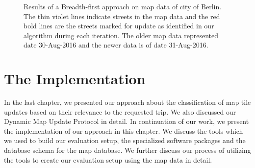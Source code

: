 \begin{figure}
\centering
{}
\hspace{5mm}
\hspace{5mm}
\label{fg:bfsberlin}
\caption{Results of a Breadth-first approach on map data of city of Berlin. The thin violet lines indicate streets in the map data and the red bold lines are the streets marked for update as identified in our algorithm during each iteration. The older map data represented date 30-Aug-2016 and the newer data is of date 31-Aug-2016.}
\end{figure}



\chapter{The Implementation}\label{ch:implementation} %
In the last chapter, we presented our approach about the classification of map tile updates based on their relevance to the requested trip. We also discussed our Dynamic Map Update Protocol in detail. In continuation of our work, we present the implementation of our approach in this chapter. We discuss the tools which we used to build our evaluation setup, the specialized software packages and the database schema for the map database. We further discuss our process of utilizing the tools to create our evaluation setup using the map data in detail. 

